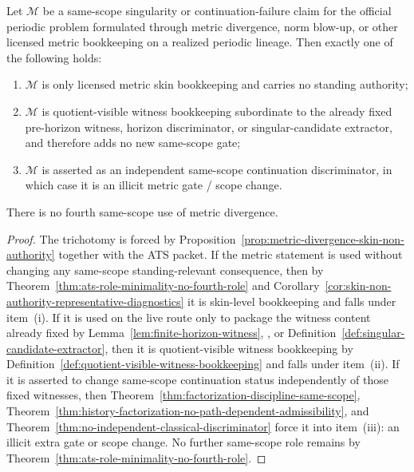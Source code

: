 \begin{manualproposition}
\label{prop:quotient-visible-witness-vs-illicit-metric-gate}
Let $\mathcal M$ be a same-scope singularity or continuation-failure claim for the official periodic problem formulated through metric divergence, norm blow-up, or other licensed metric bookkeeping on a realized periodic lineage. Then exactly one of the following holds:
\begin{enumerate}[label=(\roman*), leftmargin=2.2em]
\item $\mathcal M$ is only licensed metric skin bookkeeping and carries no standing authority;
\item $\mathcal M$ is quotient-visible witness bookkeeping subordinate to the already fixed pre-horizon witness, horizon discriminator, or singular-candidate extractor, and therefore adds no new same-scope gate;
\item $\mathcal M$ is asserted as an independent same-scope continuation discriminator, in which case it is an illicit metric gate / scope change.
\end{enumerate}
There is no fourth same-scope use of metric divergence.
\end{manualproposition}

\begin{proof}
The trichotomy is forced by Proposition~\ref{prop:metric-divergence-skin-non-authority} together with the ATS packet. If the metric statement is used without changing any same-scope standing-relevant consequence, then by Theorem~\ref{thm:ats-role-minimality-no-fourth-role} and Corollary~\ref{cor:skin-non-authority-representative-diagnostics} it is skin-level bookkeeping and falls under item~(i). If it is used on the live route only to package the witness content already fixed by Lemma~\ref{lem:finite-horizon-witness}, \HorizonDetectabilityRef{}, or Definition~\ref{def:singular-candidate-extractor}, then it is quotient-visible witness bookkeeping by Definition~\ref{def:quotient-visible-witness-bookkeeping} and falls under item~(ii). If it is asserted to change same-scope continuation status independently of those fixed witnesses, then Theorem~\ref{thm:factorization-discipline-same-scope}, Theorem~\ref{thm:history-factorization-no-path-dependent-admissibility}, and Theorem~\ref{thm:no-independent-classical-discriminator} force it into item~(iii): an illicit extra gate or scope change. No further same-scope role remains by Theorem~\ref{thm:ats-role-minimality-no-fourth-role}.
\end{proof}

